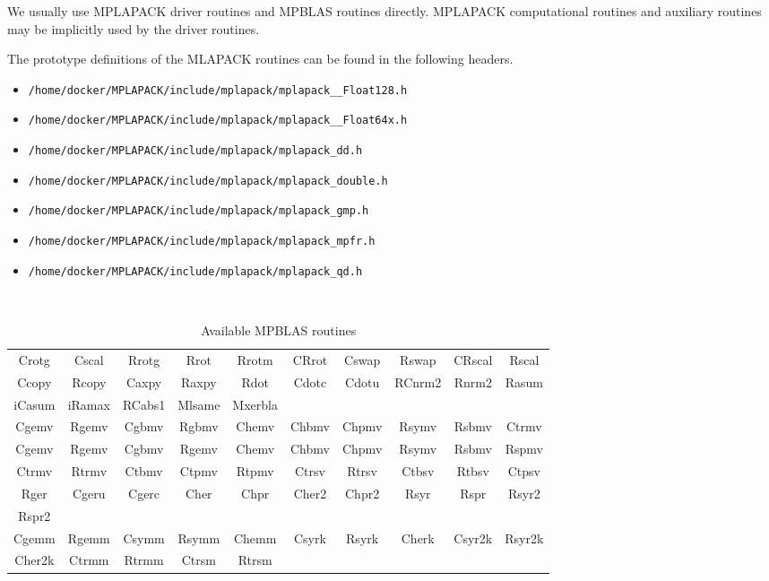 \documentclass[12pt]{article}
\begin{document}
We usually use MPLAPACK driver routines and MPBLAS routines directly. MPLAPACK computational routines and auxiliary routines
may be implicitly used by the driver routines. 

The prototype definitions of the MLAPACK routines can be found in the following headers.
\begin{itemize}
\item {\tt /home/docker/MPLAPACK/include/mplapack/mplapack\_\_Float128.h}
\item {\tt /home/docker/MPLAPACK/include/mplapack/mplapack\_\_Float64x.h}
\item {\tt /home/docker/MPLAPACK/include/mplapack/mplapack\_dd.h}
\item {\tt /home/docker/MPLAPACK/include/mplapack/mplapack\_double.h}
\item {\tt /home/docker/MPLAPACK/include/mplapack/mplapack\_gmp.h}
\item {\tt /home/docker/MPLAPACK/include/mplapack/mplapack\_mpfr.h}
\item {\tt /home/docker/MPLAPACK/include/mplapack/mplapack\_qd.h}
\end{itemize}

\begin{table}
\caption{Available MPBLAS routines}\label{mpblasroutines}
\begin{center}
{\tt
\begin{tabular}{cccccccccc} \hline
Crotg & Cscal & Rrotg & Rrot & Rrotm & CRrot & Cswap & Rswap & CRscal & Rscal \\
Ccopy & Rcopy & Caxpy & Raxpy & Rdot & Cdotc  & Cdotu & RCnrm2 & Rnrm2 & Rasum \\
iCasum & iRamax & RCabs1& Mlsame & Mxerbla \\ \hline
Cgemv & Rgemv & Cgbmv & Rgbmv & Chemv & Chbmv & Chpmv & Rsymv & Rsbmv & Ctrmv \\
Cgemv & Rgemv & Cgbmv & Rgemv & Chemv & Chbmv & Chpmv & Rsymv & Rsbmv & Rspmv \\
Ctrmv & Rtrmv & Ctbmv & Ctpmv & Rtpmv & Ctrsv & Rtrsv & Ctbsv & Rtbsv & Ctpsv \\
Rger  & Cgeru & Cgerc & Cher  & Chpr & Cher2  & Chpr2  & Rsyr  & Rspr & Rsyr2 \\
Rspr2 \\ \hline
Cgemm & Rgemm & Csymm & Rsymm & Chemm & Csyrk  & Rsyrk & Cherk & Csyr2k& Rsyr2k \\
Cher2k& Ctrmm & Rtrmm & Ctrsm & Rtrsm\\\hline
\end{tabular}
}
\end{center}
\end{table}
\end{document}
